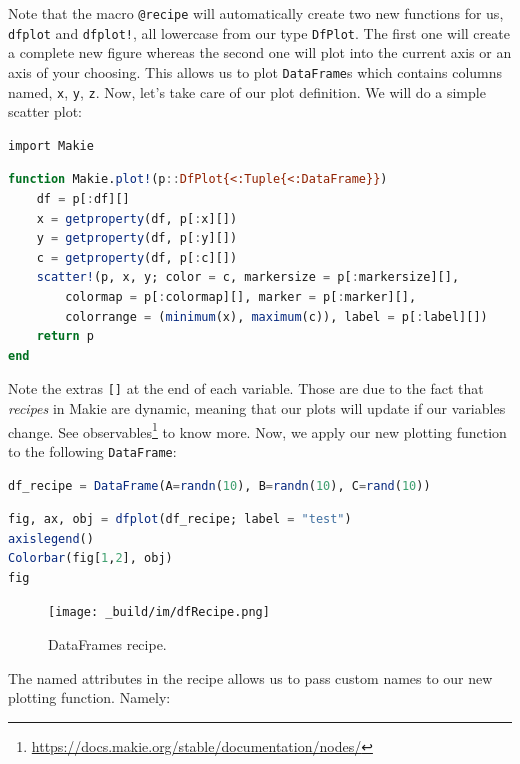 \documentclass[
  notoc %
]{tufte-book}
\DeclareRobustCommand{\href}[2]{#2\footnote{\url{#1}}}
\newcommand{\passthrough}[1]{#1}
\begin{document}
Note that the macro \passthrough{\lstinline!@recipe!} will automatically
create two new functions for us, \passthrough{\lstinline!dfplot!} and
\passthrough{\lstinline"dfplot!"}, all lowercase from our type
\passthrough{\lstinline!DfPlot!}. The first one will create a complete
new figure whereas the second one will plot into the current axis or an
axis of your choosing. This allows us to plot
\passthrough{\lstinline!DataFrame!}s which contains columns named,
\passthrough{\lstinline!x!}, \passthrough{\lstinline!y!},
\passthrough{\lstinline!z!}. Now, let's take care of our plot
definition. We will do a simple scatter plot:

\begin{lstlisting}
import Makie
\end{lstlisting}

\begin{lstlisting}[language=Julia]
function Makie.plot!(p::DfPlot{<:Tuple{<:DataFrame}})
    df = p[:df][]
    x = getproperty(df, p[:x][])
    y = getproperty(df, p[:y][])
    c = getproperty(df, p[:c][])
    scatter!(p, x, y; color = c, markersize = p[:markersize][],
        colormap = p[:colormap][], marker = p[:marker][],
        colorrange = (minimum(x), maximum(c)), label = p[:label][])
    return p
end
\end{lstlisting}

Note the extras \passthrough{\lstinline![]!} at the end of each
variable. Those are due to the fact that \emph{recipes} in Makie are
dynamic, meaning that our plots will update if our variables change. See
\href{https://docs.makie.org/stable/documentation/nodes/}{observables}
to know more. Now, we apply our new plotting function to the following
\passthrough{\lstinline!DataFrame!}:

\begin{lstlisting}[language=Julia]
df_recipe = DataFrame(A=randn(10), B=randn(10), C=rand(10))
\end{lstlisting}

\begin{lstlisting}[language=Julia]
fig, ax, obj = dfplot(df_recipe; label = "test")
axislegend()
Colorbar(fig[1,2], obj)
fig
\end{lstlisting}

\begin{figure}
\hypertarget{fig:dfRecipe}{%
\centering
\texttt{[image: \_build/im/dfRecipe.png]}
\caption{DataFrames recipe.}\label{fig:dfRecipe}
}
\end{figure}

The named attributes in the recipe allows us to pass custom names to our
new plotting function. Namely:
\end{document}

